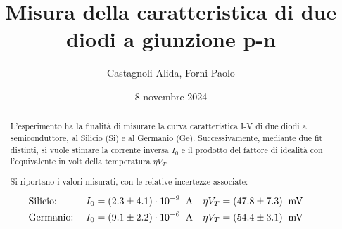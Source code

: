 \documentclass[11pt]{article}
\begin{document}
\title{\textbf{Misura della caratteristica di due diodi a giunzione p-n}}
\author{Castagnoli Alida, Forni Paolo}
\date{8 novembre 2024}
\maketitle


\vspace{-23pt}  %

\begin{abstract}
  L'esperimento ha la finalità di misurare la curva caratteristica \mbox{I-V} di due diodi a semiconduttore,
  al Silicio (Si) e al Germanio (Ge).
  Successivamente, mediante due fit distinti, si vuole stimare la corrente inversa $I_{0}$ e il prodotto del
  fattore di idealità con l'equivalente in volt della temperatura $\eta V_{T}$.

  \noindent Si riportano i valori misurati, con le relative incertezze associate:
  
  \begin{align*}
    &\textnormal{Silicio:} \;
    &I_{0} &= (2.3 \pm 4.1)\cdot 10^{-9} \;\;\textnormal{A} &
    \eta V_{T} &= (47.8 \pm 7.3)\;\;\textnormal{mV} & \\
    &\textnormal{Germanio:} \;
    &I_{0} &= (9.1 \pm 2.2) \cdot 10^{-6} \;\;\textnormal{A} &
    \eta V_{T} &= (54.4 \pm 3.1)\;\;\textnormal{mV} &
  \end{align*}

\end{abstract}

\vspace{0.1cm}

\newpage



\clearpage
\appendix

\end{document}
